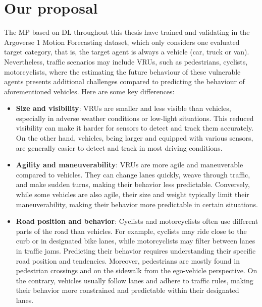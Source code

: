 \section{Our proposal}
\label{sec:7_our_proposal}

The \ac{MP} based on \ac{DL} throughout this thesis have trained and validating in the Argoverse 1 Motion Forecasting dataset, which only considers one evaluated target category, that is, the target agent is always a vehicle (car, truck or van). Nevertheless, traffic scenarios may include \acp{VRU}, such as pedestrians, cyclists, motorcyclists, where the estimating the future behaviour of these vulnerable agents presents additional challenges compared to predicting the behaviour of aforementioned vehicles. Here are some key differences:

\begin{itemize}
	
	\item \textbf{Size and visibility}: \acp{VRU} are smaller and less visible than vehicles, especially in adverse weather conditions or low-light situations. This reduced visibility can make it harder for sensors to detect and track them accurately. On the other hand, vehicles, being larger and equipped with various sensors, are generally easier to detect and track in most driving conditions.
	
	\item \textbf{Agility and maneuverability}: \acp{VRU} are more agile and maneuverable compared to vehicles. They can change lanes quickly, weave through traffic, and make sudden turns, making their behavior less predictable. Conversely, while some vehicles are also agile, their size and weight typically limit their maneuverability, making their behavior more predictable in certain situations.
	
	\item \textbf{Road position and behavior}: Cyclists and motorcyclists often use different parts of the road than vehicles. For example, cyclists may ride close to the curb or in designated bike lanes, while motorcyclists may filter between lanes in traffic jams. Predicting their behavior requires understanding their specific road position and tendencies. Moreover, pedestrians are mostly found in pedestrian crossings and on the sidewalk from the ego-vehicle perspective. On the contrary, vehicles usually follow lanes and adhere to traffic rules, making their behavior more constrained and predictable within their designated lanes.
	

\end{itemize}
